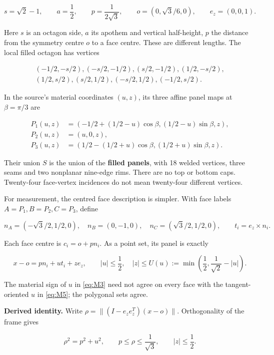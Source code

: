 \documentclass[11pt,a4paper]{article}
\begin{document}
\[
s=\sqrt2-1,\qquad a=\frac12,\qquad p=\frac1{2\sqrt3},
\qquad o=(0,\sqrt3/6,0),\qquad e_z=(0,0,1).
\tag{M1}\label{eq:M1}
\]

Here \(s\) is an octagon side, \(a\) its apothem and vertical half-height, \(p\) the distance from the symmetry centre \(o\) to a face centre. These are different lengths. The local filled octagon has vertices

\[
\begin{gathered}(-1/2,-s/2),(-s/2,-1/2),(s/2,-1/2),(1/2,-s/2),\\
(1/2,s/2),(s/2,1/2),(-s/2,1/2),(-1/2,s/2).\end{gathered}
\tag{M2}\label{eq:M2}
\]

In the source's material coordinates \((u,z)\), its three affine panel maps at \(\beta=\pi/3\) are

\[
\begin{aligned}
P_1(u,z)&=(-1/2+(1/2-u)\cos\beta,(1/2-u)\sin\beta,z),\\
P_2(u,z)&=(u,0,z),\\
P_3(u,z)&=(1/2-(1/2+u)\cos\beta,(1/2+u)\sin\beta,z).
\end{aligned}\tag{M3}\label{eq:M3}
\]

Their union \(S\) is the union of the \textbf{filled panels}, with 18 welded vertices, three seams and two nonplanar nine-edge rims. There are no top or bottom caps. Twenty-four face-vertex incidences do not mean twenty-four different vertices.

For measurement, the centred face description is simpler. With face labels \(A=P_1,B=P_2,C=P_3\), define

\[
n_A=(-\sqrt3/2,1/2,0),\quad n_B=(0,-1,0),\quad
n_C=(\sqrt3/2,1/2,0),\qquad t_i=e_z\times n_i.
\tag{M4}\label{eq:M4}
\]

Each face centre is \(c_i=o+pn_i\). As a point set, its panel is exactly

\[
x-o=pn_i+ut_i+ze_z,\qquad |u|\le\frac12,
\quad |z|\le U(u):=\min\left(\frac12,\frac1{\sqrt2}-|u|\right).
\tag{M5}\label{eq:M5}
\]

The material sign of \(u\) in \eqref{eq:M3} need not agree on every face with the tangent-oriented \(u\) in \eqref{eq:M5}; the polygonal sets agree.

\textbf{Derived identity.} Write \(\rho=\|(I-e_ze_z^T)(x-o)\|\). Orthogonality of the frame gives

\[
\rho^2=p^2+u^2,\qquad p\le\rho\le\frac1{\sqrt3},
\qquad |z|\le\frac12.
\tag{M6}\label{eq:M6}
\]
\end{document}
